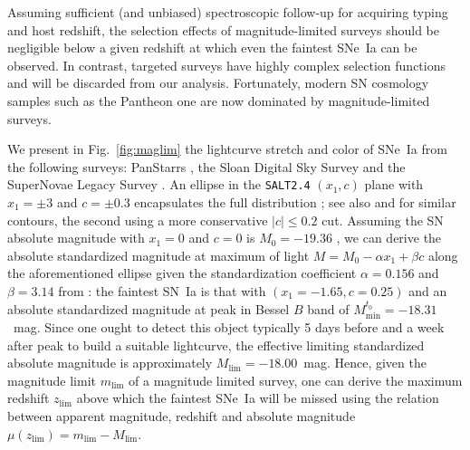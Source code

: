 \documentclass[]{aa}
\begin{document}
Assuming sufficient (and unbiased) spectroscopic follow-up for acquiring typing
and host redshift, the selection effects of magnitude-limited surveys should be
negligible below a given redshift at which even the faintest SNe~Ia can be
observed. In contrast, targeted surveys have highly complex selection functions
and will be discarded from our analysis. Fortunately, modern SN cosmology
samples such as the Pantheon one are now dominated by magnitude-limited surveys.

We present in Fig.~\ref{fig:maglim} the lightcurve stretch and color of SNe~Ia
from the following surveys: PanStarrs \citep[PS1][]{rest2014}, the Sloan Digital
Sky Survey \citep[SDSS][]{frieman2008} and the SuperNovae Legacy Survey
\citep[SNLS][]{astier2006}. An ellipse in the \textsc{\texttt{SALT2.4}} $(x_1,
c)$ plane with $x_1 = \pm 3$ and $c = \pm 0.3$ encapsulates the full
distribution \citep{guy2007,betoule2014}; see also \citet{bazin2011} and
\citet{campbell2013} for similar contours, the second using a more conservative
$|c| \leq 0.2$ cut. Assuming the SN absolute magnitude with $x_1=0$ and $c=0$
is $M_0=-19.36$ \citep{kessler2009,scolnic2014}, we can derive the absolute
standardized magnitude at maximum of light $M = M_0 - \alpha x_1 + \beta c$
along the aforementioned ellipse given the standardization coefficient
$\alpha=0.156$ and $\beta=3.14$ from \cite{scolnic2018a}: the faintest SN~Ia is
that with $(x_1=-1.65, c=0.25)$ and an absolute standardized magnitude at peak
in Bessel $B$ band of $M^{t_0}_{\min} = -18.31$~mag. Since one ought to detect
this object typically 5 days before and a week after peak to build a suitable
lightcurve, the effective limiting standardized absolute magnitude is
approximately $M_{\lim} = -18.00$~mag. Hence, given the magnitude limit $m_{\lim}$
of a magnitude limited survey, one can derive the maximum redshift $z_{\lim}$
above which the faintest SNe~Ia will be missed using the relation between
apparent magnitude, redshift and absolute magnitude $\mu(z_{\lim}) = m_{\lim} -
M_{\lim}$.
\end{document}
